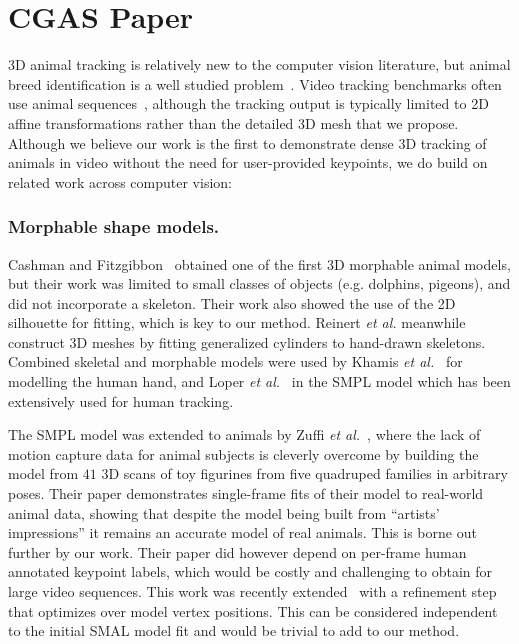 \section{CGAS Paper}
3D animal tracking is relatively new to the computer vision literature, but animal breed identification is a well studied problem~\cite{imagenet_cvpr09}. Video tracking benchmarks often use animal sequences~\cite{DAVIS2017-1st,DAVIS2017-2nd}, although the tracking output is typically limited to 2D affine transformations rather than the detailed 3D mesh that we propose.  Although we believe our work is the first to demonstrate dense 3D tracking of animals in video without the need for user-provided keypoints, we do build on related work across computer vision:

\subsubsection*{Morphable shape models.}
Cashman and Fitzgibbon~\cite{cashman2013shape} obtained one of the first 3D morphable animal models, but their work was limited to small classes of objects (e.g. dolphins, pigeons), and did not incorporate a skeleton.  Their work also showed the use of the 2D silhouette for fitting, which is key to our method. 
Reinert {\em et al.} \cite{reinert2016animated} meanwhile construct 3D meshes by fitting generalized cylinders to hand-drawn skeletons.
Combined skeletal and morphable models were used by Khamis {\em et al.}~\cite{hand-shape} for modelling the human hand, and Loper {\em et al.}~\cite{loper15smpl} in the SMPL model which has been extensively used for human tracking. 

The SMPL model was extended to animals by Zuffi {\em et al.}~\cite{zuffi2017menagerie}, where the lack of motion capture data for animal subjects is cleverly overcome by building the model from $41$ 3D scans of toy figurines from five quadruped families in arbitrary poses. Their paper demonstrates single-frame fits of their model to real-world animal data, showing that despite the model being built from ``artists' impressions'' it remains an accurate model of real animals. This is borne out further by our work.  Their paper did however depend on per-frame human annotated keypoint labels, which would be costly and challenging to obtain for large video sequences. This work was recently extended~\cite{zuffi_lions} with a refinement step that optimizes over model vertex positions. This can be considered independent to the initial SMAL model fit and would be trivial to add to our method.

